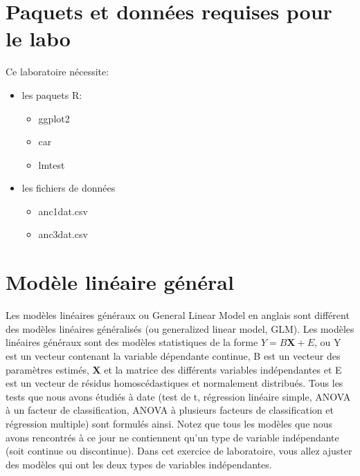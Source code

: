 \documentclass[12pt,]{book}
\providecommand{\tightlist}{%
  \setlength{\itemsep}{0pt}\setlength{\parskip}{0pt}}
\begin{document}
\hypertarget{set-anco}{%
\section{Paquets et données requises pour le labo}\label{set-anco}}

Ce laboratoire nécessite:

\begin{itemize}
\tightlist
\item
  les paquets R:

  \begin{itemize}
  \tightlist
  \item
    ggplot2
  \item
    car
  \item
    lmtest
  \end{itemize}
\item
  les fichiers de données

  \begin{itemize}
  \tightlist
  \item
    anc1dat.csv
  \item
    anc3dat.csv
  \end{itemize}
\end{itemize}

\hypertarget{moduxe8le-linuxe9aire-guxe9nuxe9ral}{%
\section{Modèle linéaire général}\label{moduxe8le-linuxe9aire-guxe9nuxe9ral}}

Les modèles linéaires généraux ou General Linear Model en anglais sont différent des modèles linéaires généralisés (ou generalized linear model, GLM). Les modèles linéaires généraux sont des modèles statistiques de la forme \(Y = B \mathbf{X} + E\), ou Y est un vecteur contenant la variable dépendante continue, B est un vecteur des paramètres estimés, \(\mathbf{X}\) et la matrice des différents variables indépendantes et E est un vecteur de résidus homoscédastiques et normalement distribués. Tous les tests que nous avons étudiés à date (test de t, régression linéaire simple, ANOVA à un facteur de classification, ANOVA à plusieurs facteurs de classification et régression multiple) sont formulés ainsi. Notez que tous les modèles que nous avons rencontrés à ce jour ne contiennent qu'un type de variable indépendante (soit continue ou discontinue). Dans cet exercice de laboratoire, vous allez ajuster des modèles qui ont les deux types de variables indépendantes.
\end{document}
